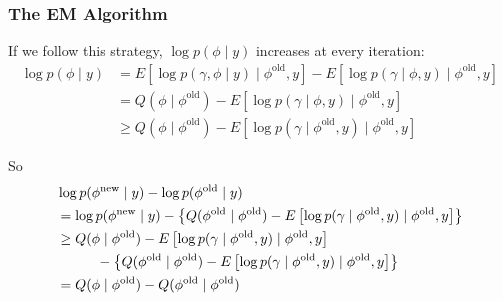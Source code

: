 \documentclass{beamer}
\begin{document}
\begin{frame}[fragile]
\frametitle{The EM Algorithm}

If we follow this strategy, $\log p(\phi \mid y)$ increases at every iteration:
\begin{align*}
\log p(\phi \mid y) &=  E\left[ \log p(\gamma, \phi \mid y) \mid \phi^{\text{old}}, y \right] - E\left[\log p(\gamma \mid \phi, y) \mid \phi^{\text{old}}, y \right]\\
&= Q(\phi \mid \phi^{\text{old}}) - E\left[\log p(\gamma \mid \phi, y) \mid \phi^{\text{old}}, y \right] \tag{defn. Q} \\
&\ge Q(\phi \mid \phi^{\text{old}}) - E\left[\log p(\gamma \mid \phi^{\text{old}}, y) \mid \phi^{\text{old}}, y \right] \tag{HW}
\end{align*}
\pause

So 
\begin{align*}
&\log p(\phi^{\text{new}} \mid y) - \log p(\phi^{\text{old}} \mid y) \\
&= \log p(\phi^{\text{new}} \mid y) - \left\{Q(\phi^{\text{old}} \mid \phi^{\text{old}}) - E\left[\log p(\gamma \mid \phi^{\text{old}}, y) \mid \phi^{\text{old}}, y \right] \right\} \\
&\ge Q(\phi \mid \phi^{\text{old}}) - E\left[\log p(\gamma \mid \phi^{\text{old}}, y) \mid \phi^{\text{old}}, y \right] \\
&\hspace{10mm} - \left\{Q(\phi^{\text{old}} \mid \phi^{\text{old}}) - E\left[\log p(\gamma \mid \phi^{\text{old}}, y) \mid \phi^{\text{old}}, y \right] \right\} \\
&= Q(\phi \mid \phi^{\text{old}}) - Q(\phi^{\text{old}} \mid \phi^{\text{old}})
\end{align*}

\end{frame}
\end{document}
